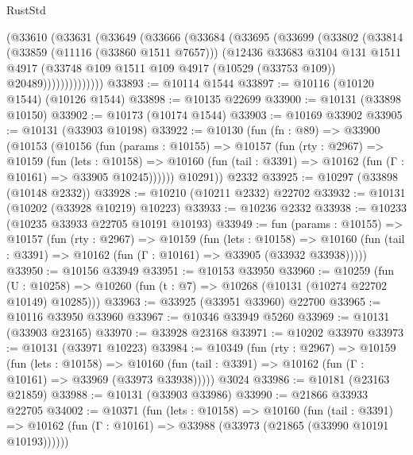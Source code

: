 \begin{lexlean}{RustStd}
\begin{coremodule}
          (@33610
            (@33631
              (@33649
                (@33666
                  (@33684
                    (@33695
                      (@33699
                        (@33802
                          (@33814
                            (@33859 (@11116 (@33860 @1511 @7657)))
                            (@12436
                              @33683
                              @3104
                              @131
                              @1511
                              @4917
                              (@33748
                                @109
                                @1511
                                @109
                                @4917
                                (@10529 (@33753 @109))
                                @20489))))))))))))))
@33893 := @10114 @1544
@33897 := @10116 (@10120 @1544) (@10126 @1544)
@33898 := @10135 @22699
@33900 := @10131 (@33898 @10150)
@33902 := @10173 (@10174 @1544)
@33903 := @10169 @33902
@33905 := @10131 (@33903 @10198)
@33922 := @10130
    (fun (fn : @89) =>
    @33900
      (@10153
        (@10156
          (fun (params : @10155) =>
          @10157
            (fun (rty : @2967) =>
            @10159
              (fun (lets : @10158) =>
              @10160 (fun (tail : @3391) => @10162 (fun (Γ : @10161) => @33905 @10245))))))
        @10291))
    @2332
@33925 := @10297 (@33898 (@10148 @2332))
@33928 := @10210 (@10211 @2332) @22702
@33932 := @10131 (@10202 (@33928 @10219) @10223)
@33933 := @10236 @2332
@33938 := @10233 (@10235 @33933 @22705 @10191 @10193)
@33949 := fun (params : @10155) =>
  @10157
    (fun (rty : @2967) =>
    @10159
      (fun (lets : @10158) =>
      @10160 (fun (tail : @3391) => @10162 (fun (Γ : @10161) => @33905 (@33932 @33938)))))
@33950 := @10156 @33949
@33951 := @10153 @33950
@33960 := @10259
    (fun (U : @10258) => @10260 (fun (t : @7) => @10268 (@10131 (@10274 @22702 @10149) @10285)))
@33963 := @33925 (@33951 @33960) @22700
@33965 := @10116 @33950 @33960
@33967 := @10346 @33949 @5260
@33969 := @10131 (@33903 @23165)
@33970 := @33928 @23168
@33971 := @10202 @33970
@33973 := @10131 (@33971 @10223)
@33984 := @10349
    (fun (rty : @2967) =>
    @10159
      (fun (lets : @10158) =>
      @10160 (fun (tail : @3391) => @10162 (fun (Γ : @10161) => @33969 (@33973 @33938)))))
    @3024
@33986 := @10181 (@23163 @21859)
@33988 := @10131 (@33903 @33986)
@33990 := @21866 @33933 @22705
@34002 := @10371
    (fun (lets : @10158) =>
    @10160
      (fun (tail : @3391) =>
      @10162 (fun (Γ : @10161) => @33988 (@33973 (@21865 (@33990 @10191 @10193))))))

\end{coremodule}
\end{lexlean}
